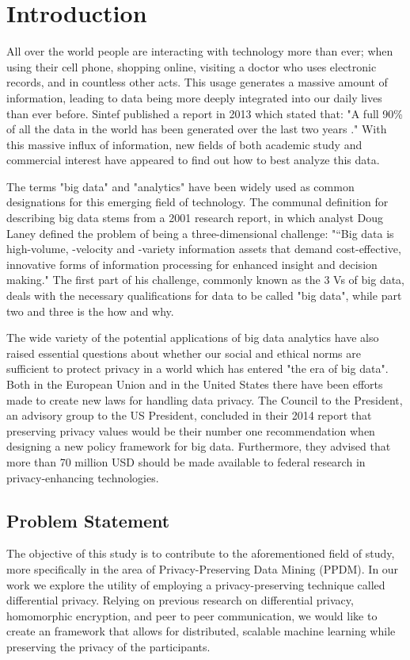 
\chapter{Introduction}
All over the world people are interacting with technology more than ever; when using their cell phone, shopping online, visiting a doctor who uses electronic records, and in countless other acts. This usage generates a massive amount of information, leading to data being more deeply integrated into our daily lives than ever before. Sintef published a report in 2013 which stated that: "A full 90\% of all the data in the world has been generated over the last two years \citep{dragland2013big}." With this massive influx of information, new fields of both academic study and commercial interest have appeared to find out how to best analyze this data. 

The terms "big data" and "analytics" have been widely used as common designations for this emerging field of technology. The communal definition for describing big data stems from a 2001 research report\citep{laney2001dataVs}, in which analyst Doug Laney defined the problem of being a three-dimensional challenge: "“Big data is high-volume, -velocity and -variety information assets that demand cost-effective, innovative forms of information processing for enhanced insight and decision making." The first part of his challenge, commonly known as the 3 Vs of big data, deals with the necessary qualifications for data to be called "big data", while part two and three is the how and why.  
   
The wide variety of the potential applications of big data analytics have also raised essential questions about whether our social and ethical norms are sufficient to protect privacy in a world which has entered "the era of big data". Both in the European Union and in the United States there have been efforts made to create new laws for handling data privacy. The Council to the President, an advisory group to the US President, concluded in their 2014 report \citep{house2014bigdata} that preserving privacy values would be their number one recommendation when designing a new policy framework for big data. Furthermore, they advised that more than 70 million USD should be made available to federal research in privacy-enhancing technologies. 

\section{Problem Statement}
\label{sec:problem_statement}
The objective of this study is to contribute to the aforementioned field of study, more specifically in the area of Privacy-Preserving Data Mining (PPDM). In our work we explore the utility of employing a privacy-preserving technique called differential privacy. Relying on previous research on differential privacy, homomorphic encryption, and peer to peer communication, we would like to create an framework that allows for distributed, scalable machine learning while preserving the privacy of the participants. 

